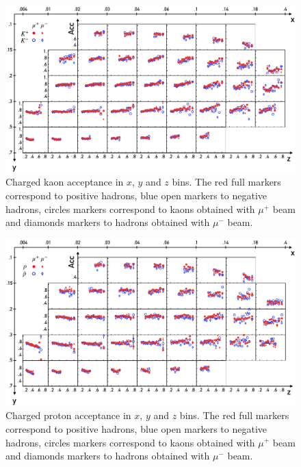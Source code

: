 \begin{figure}
  \centering
	\includegraphics[scale=0.6]{./gfx/AccK.png}
	\caption{Charged kaon acceptance in $x$, $y$ and $z$ bins. The red full markers correspond to positive hadrons, blue open markers to negative hadrons, circles markers correspond to kaons obtained with $\mu^+$ beam and diamonds markers to hadrons obtained with $\mu^-$ beam.}
	\label{pic:AccK}
\end{figure}

\begin{figure}
  \centering
	\includegraphics[scale=0.5]{./gfx/AccP.png}
	\caption{Charged proton acceptance in $x$, $y$ and $z$ bins. The red full markers correspond to positive hadrons, blue open markers to negative hadrons, circles markers correspond to kaons obtained with $\mu^+$ beam and diamonds markers to hadrons obtained with $\mu^-$ beam.}
	\label{pic:AccP}
\end{figure}

